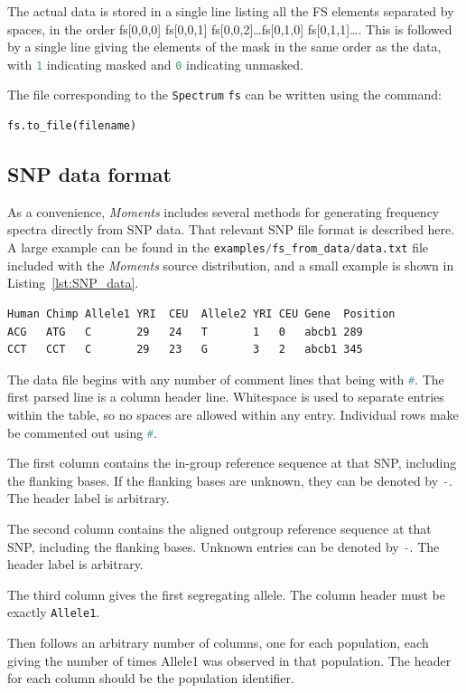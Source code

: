\documentclass[12pt]{article}
\makeatletter
\newcommand{\py}[1]{\lstinline[breaklines=true,language=Python, showstringspaces=False]@#1@}
\makeatother
\begin{document}
The actual data is stored in a single line listing all the FS elements separated by spaces, in the order fs[0,0,0] fs[0,0,1] fs[0,0,2]\dots fs[0,1,0] fs[0,1,1]\dots.
This is followed by a single line giving the elements of the mask in the same order as the data, with \py{1} indicating masked and \py{0} indicating unmasked.

The file corresponding to the \py{Spectrum} \py{fs} can be written using the command:
\begin{lstlisting}
fs.to_file(filename)
\end{lstlisting}

\subsection{SNP data format}

As a convenience, \textit{Moments} includes several methods for generating frequency spectra directly from SNP data.
That relevant SNP file format is described here.
A large example can be found in the \py{examples/fs_from_data/data.txt} file included with the \textit{Moments} source distribution, and a small example is shown in Listing~\ref{lst:SNP_data}.

\begin{lstlisting}[caption={Example of SNP file format}, float, label={lst:SNP_data}]
Human Chimp Allele1 YRI  CEU  Allele2 YRI CEU Gene  Position
ACG   ATG   C       29   24   T       1   0   abcb1 289
CCT   CCT   C       29   23   G       3   2   abcb1 345
\end{lstlisting}

The data file begins with any number of comment lines that being with \py{#}.
The first parsed line is a column header line.
Whitespace is used to separate entries within the table, so no spaces are allowed within any entry.
Individual rows make be commented out using \py{#}.

The first column contains the in-group reference sequence at that SNP, including the flanking bases.
If the flanking bases are unknown, they can be denoted by \py{-}.
The header label is arbitrary.

The second column contains the aligned outgroup reference sequence at that SNP, including the flanking bases.
Unknown entries can be denoted by \py{-}.
The header label is arbitrary.

The third column gives the first segregating allele.
The column header must be exactly \py{Allele1}.

Then follows an arbitrary number of columns, one for each population, each giving the number of times Allele1 was observed in that population.
The header for each column should be the population identifier.
\end{document}
